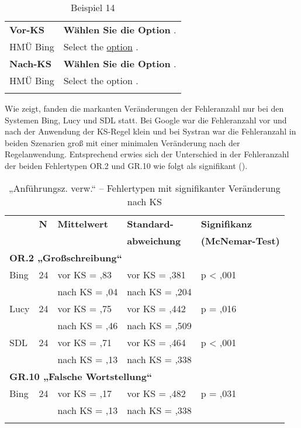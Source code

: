 \begin{table}
\begin{tabularx}{\textwidth}{lQ}
\lsptoprule
\textbf{Vor-KS} & \textbf{Wählen Sie die Option} .\\
\tablevspace
HMÜ Bing & Select the  \ul{option}  .\\
\midrule
\textbf{Nach-KS} & \textbf{Wählen Sie die Option} .\\
\tablevspace
HMÜ Bing & Select the option .\\
\lspbottomrule
\end{tabularx}
\caption{\label{tabex:05:14}Beispiel 14   }
\end{table}

Wie  zeigt, fanden die markanten Veränderungen der Fehleranzahl nur bei den Systemen Bing, Lucy und SDL statt. Bei Google war die Fehleranzahl vor und nach der Anwendung der KS-Regel klein und bei Systran war die Fehleranzahl in beiden Szenarien groß mit einer minimalen Veränderung nach der Regelanwendung. Entsprechend erwies sich der Unterschied in der Fehleranzahl der beiden Fehlertypen OR.2 und GR.10 wie folgt als signifikant ().


\begin{table}
\begin{tabularx}{.81\textwidth}{lllll}
\lsptoprule
& \textbf{N} & \textbf{Mittelwert} & \textbf{Standard-} & \textbf{Signifikanz}\\
& &  & \textbf{abweichung} & \textbf{(McNemar-Test)}\\
\midrule
\multicolumn{5}{l}{\textbf{OR.2 „Großschreibung“}}\\
 Bing & 24 & vor KS = ,83 & vor KS = ,381 & p < ,001\\
 & & nach KS = ,04 & nach KS = ,204 &\\
 Lucy & 24 & vor KS = ,75 & vor KS = ,442 & p = ,016\\
 & & nach KS = ,46 & nach KS = ,509 &\\
 SDL & 24 & vor KS = ,71 & vor KS = ,464 & p < ,001\\
 & & nach KS = ,13 & nach KS = ,338 &\\
\midrule
\multicolumn{5}{l}{\textbf{GR.10 „Falsche Wortstellung“}}\\
 Bing & 24 & vor KS = ,17 & vor KS = ,482 & p = ,031\\
 & & nach KS = ,13 & nach KS = ,338 &\\
\lspbottomrule
\end{tabularx}
\caption{\label{tab:05:24} „Anführungsz. verw.“ -- Fehlertypen mit signifikanter Veränderung nach KS  }
\end{table}


